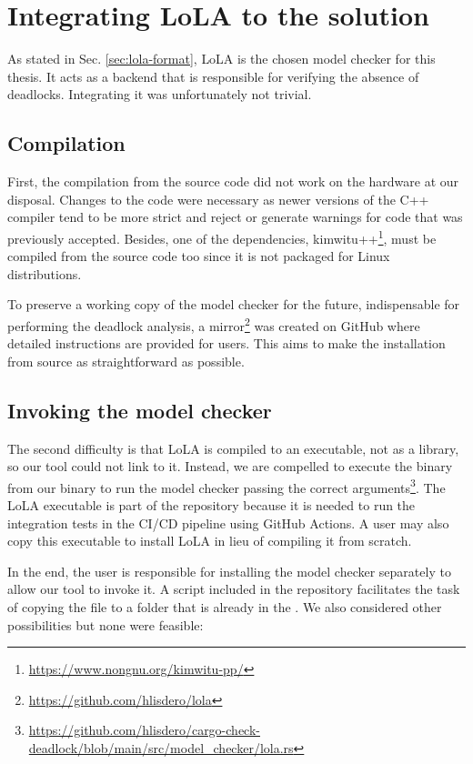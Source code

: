 \section{Integrating LoLA to the solution}

As stated in Sec. \ref{sec:lola-format},
\acrshort{LoLA} is the chosen model checker for this thesis.
It acts as a backend that is responsible for verifying the absence of deadlocks.
Integrating it was unfortunately not trivial.

\subsection{Compilation}

First, the compilation from the source code did not work on the hardware at our disposal.
Changes to the code were necessary as newer versions of the C++ compiler tend to be more strict
and reject or generate warnings for code that was previously accepted.
Besides, one of the dependencies, kimwitu++\footnote{\url{https://www.nongnu.org/kimwitu-pp/}},
must be compiled from the source code too
since it is not packaged for Linux distributions.

To preserve a working copy of the model checker for the future,
indispensable for performing the deadlock analysis,
a mirror\footnote{\url{https://github.com/hlisdero/lola}}
was created on GitHub where detailed instructions are provided for users.
This aims to make the installation from source as straightforward as possible.

\subsection{Invoking the model checker}

The second difficulty is that \acrshort{LoLA} is compiled to an executable,
not as a library, so our tool could not link to it.
Instead, we are compelled to execute the binary
from our  binary
to run the model checker passing the correct
arguments\footnote{\url{https://github.com/hlisdero/cargo-check-deadlock/blob/main/src/model_checker/lola.rs}}.
The \acrshort{LoLA} executable is part of the repository because it is needed
to run the integration tests in the CI/CD pipeline using GitHub Actions.
A user may also copy this executable to install \acrshort{LoLA}
in lieu of compiling it from scratch.

In the end, the user is responsible for installing the model checker separately
to allow our tool to invoke it.
A script  included in the repository
facilitates the task of copying the file to a folder that is already in the .
We also considered other possibilities but none were feasible:

